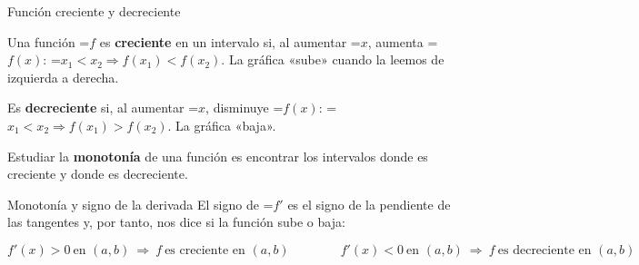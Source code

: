 \documentclass[11pt,a4paper]{article}
\newcommand{\lt}{<}\newcommand{\gt}{>}
\newcommand{\fmm}[1]{\setbox0=\hbox{$#1$}\ifdim\wd0>\linewidth\[#1\]\else\mbox{\box0}\fi}
\begin{document}
  

  
\begin{fmdef}{Función creciente y decreciente}
\par\noindent \begin{minipage}[t]{0.48\linewidth}\vspace{0pt}\raggedright Una función \fmm{f} es \textbf{creciente} en un intervalo si, al aumentar \fmm{x}, aumenta \fmm{f(x)}: \fmm{x_1\lt x_2\Rightarrow f(x_1)\lt f(x_2)}. La gráfica «sube» cuando la leemos de izquierda a derecha.

          

Es \textbf{decreciente} si, al aumentar \fmm{x}, disminuye \fmm{f(x)}: \fmm{x_1\lt x_2\Rightarrow f(x_1)\gt f(x_2)}. La gráfica «baja».

          

Estudiar la \textbf{monotonía} de una función es encontrar los intervalos donde es creciente y donde es decreciente.\end{minipage}\hfill\begin{minipage}[t]{0.48\linewidth}\vspace{0pt}\raggedright \begin{center}\end{center}\end{minipage}\par\medskip
\end{fmdef}

  
\begin{fmprop}{Monotonía y signo de la derivada}
El signo de \fmm{f'} es el signo de la pendiente de las tangentes y, por tanto, nos dice si la función sube o baja:

      
\[f'(x)\gt0\ \text{en }(a,b)\ \Rightarrow\ f\ \text{es creciente en }(a,b)\qquad\qquad f'(x)\lt0\ \text{en }(a,b)\ \Rightarrow\ f\ \text{es decreciente en }(a,b)\]

\end{fmprop}
\end{document}
